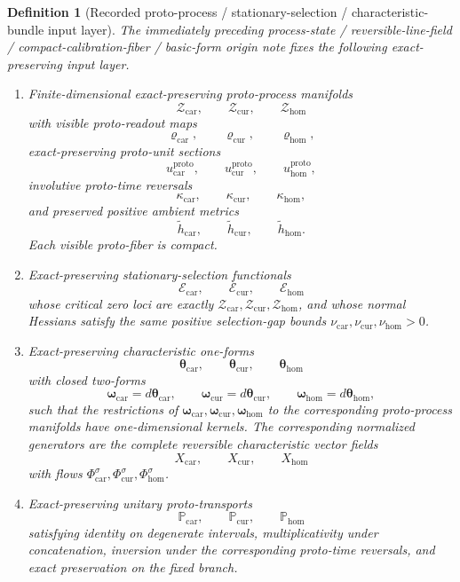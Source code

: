 \documentclass[11pt]{article}
\newcommand{\TensorFlowField}{X_{\mathrm{car}}}
\newcommand{\CurFlowField}{X_{\mathrm{cur}}}
\newcommand{\HomFlowField}{X_{\mathrm{hom}}}
\newcommand{\TensorOrbitFlow}{\Phi_{\mathrm{car}}}
\newcommand{\CurOrbitFlow}{\Phi_{\mathrm{cur}}}
\newcommand{\HomOrbitFlow}{\Phi_{\mathrm{hom}}}
\newcommand{\TensorProtoSpace}{\mathcal Z_{\mathrm{car}}}
\newcommand{\CurProtoSpace}{\mathcal Z_{\mathrm{cur}}}
\newcommand{\HomProtoSpace}{\mathcal Z_{\mathrm{hom}}}
\newcommand{\TensorProtoRead}{\varrho_{\mathrm{car}}}
\newcommand{\CurProtoRead}{\varrho_{\mathrm{cur}}}
\newcommand{\HomProtoRead}{\varrho_{\mathrm{hom}}}
\newcommand{\TensorProtoUnit}{u_{\mathrm{car}}^{\mathrm{proto}}}
\newcommand{\CurProtoUnit}{u_{\mathrm{cur}}^{\mathrm{proto}}}
\newcommand{\HomProtoUnit}{u_{\mathrm{hom}}^{\mathrm{proto}}}
\newcommand{\TensorProtoTimeRev}{\kappa_{\mathrm{car}}}
\newcommand{\CurProtoTimeRev}{\kappa_{\mathrm{cur}}}
\newcommand{\HomProtoTimeRev}{\kappa_{\mathrm{hom}}}
\newcommand{\TensorProtoAmbientMetric}{\widetilde h_{\mathrm{car}}}
\newcommand{\CurProtoAmbientMetric}{\widetilde h_{\mathrm{cur}}}
\newcommand{\HomProtoAmbientMetric}{\widetilde h_{\mathrm{hom}}}
\newcommand{\TensorSelection}{\mathscr E_{\mathrm{car}}}
\newcommand{\CurSelection}{\mathscr E_{\mathrm{cur}}}
\newcommand{\HomSelection}{\mathscr E_{\mathrm{hom}}}
\newcommand{\TensorSelGap}{\nu_{\mathrm{car}}}
\newcommand{\CurSelGap}{\nu_{\mathrm{cur}}}
\newcommand{\HomSelGap}{\nu_{\mathrm{hom}}}
\newcommand{\TensorCharForm}{\boldsymbol{\theta}_{\mathrm{car}}}
\newcommand{\CurCharForm}{\boldsymbol{\theta}_{\mathrm{cur}}}
\newcommand{\HomCharForm}{\boldsymbol{\theta}_{\mathrm{hom}}}
\newcommand{\TensorCharTwo}{\boldsymbol{\omega}_{\mathrm{car}}}
\newcommand{\CurCharTwo}{\boldsymbol{\omega}_{\mathrm{cur}}}
\newcommand{\HomCharTwo}{\boldsymbol{\omega}_{\mathrm{hom}}}
\newcommand{\TensorProtoTransport}{\mathbb P_{\mathrm{car}}}
\newcommand{\CurProtoTransport}{\mathbb P_{\mathrm{cur}}}
\newcommand{\HomProtoTransport}{\mathbb P_{\mathrm{hom}}}
\newtheorem{definition}{Definition}
\begin{document}
\begin{definition}[Recorded proto-process / stationary-selection / characteristic-bundle input layer]
\label{def:recorded_proto_layer}
The immediately preceding process-state / reversible-line-field / compact-calibration-fiber / basic-form origin note fixes the following exact-preserving input layer.
\begin{enumerate}
    \item Finite-dimensional exact-preserving proto-process manifolds
    \[
    \TensorProtoSpace,\qquad
    \CurProtoSpace,\qquad
    \HomProtoSpace
    \]
    with visible proto-readout maps
    \[
    \TensorProtoRead,\qquad
    \CurProtoRead,\qquad
    \HomProtoRead,
    \]
    exact-preserving proto-unit sections
    \[
    \TensorProtoUnit,\qquad
    \CurProtoUnit,\qquad
    \HomProtoUnit,
    \]
    involutive proto-time reversals
    \[
    \TensorProtoTimeRev,\qquad
    \CurProtoTimeRev,\qquad
    \HomProtoTimeRev,
    \]
    and preserved positive ambient metrics
    \[
    \TensorProtoAmbientMetric,\qquad
    \CurProtoAmbientMetric,\qquad
    \HomProtoAmbientMetric.
    \]
    Each visible proto-fiber is compact.
    \item Exact-preserving stationary-selection functionals
    \[
    \TensorSelection,\qquad
    \CurSelection,\qquad
    \HomSelection
    \]
    whose critical zero loci are exactly \(\TensorProtoSpace,\CurProtoSpace,\HomProtoSpace\), and whose normal Hessians satisfy the same positive selection-gap bounds \(\TensorSelGap,\CurSelGap,\HomSelGap>0\).
    \item Exact-preserving characteristic one-forms
    \[
    \TensorCharForm,\qquad
    \CurCharForm,\qquad
    \HomCharForm
    \]
    with closed two-forms
    \[
    \TensorCharTwo=d\TensorCharForm,\qquad
    \CurCharTwo=d\CurCharForm,\qquad
    \HomCharTwo=d\HomCharForm,
    \]
    such that the restrictions of \(\TensorCharTwo,\CurCharTwo,\HomCharTwo\) to the corresponding proto-process manifolds have one-dimensional kernels. The corresponding normalized generators are the complete reversible characteristic vector fields
    \[
    \TensorFlowField,\qquad
    \CurFlowField,\qquad
    \HomFlowField
    \]
    with flows \(\TensorOrbitFlow^\sigma,\CurOrbitFlow^\sigma,\HomOrbitFlow^\sigma\).
    \item Exact-preserving unitary proto-transports
    \[
    \TensorProtoTransport,\qquad
    \CurProtoTransport,\qquad
    \HomProtoTransport
    \]
    satisfying identity on degenerate intervals, multiplicativity under concatenation, inversion under the corresponding proto-time reversals, and exact preservation on the fixed branch.

\end{enumerate}
\end{definition}
\end{document}
